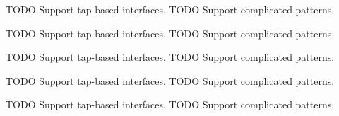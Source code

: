 
\begin{DoxyRefList}
\item[\label{todo__todo000015}%
\Hypertarget{todo__todo000015}%
Member \hyperlink{route-tree_8c_ad4fe4de0af6177aad9c1936fcaa1d988}{analyze\+\_\+anyconnect\+\_\+kernel\+\_\+route} (G\+Node $\ast$kernel\+\_\+route\+\_\+roots\mbox{[}M\+A\+X\+\_\+\+R\+O\+O\+T\+S\+\_\+\+N\+U\+M\+B\+ER\mbox{]}, int $\ast$kernel\+\_\+roots)]T\+O\+DO Support tap-\/based interfaces. T\+O\+DO Support complicated patterns. 
\item[\label{todo__todo000024}%
\Hypertarget{todo__todo000024}%
Member \hyperlink{route-tree_8h_a5a490e2e29be18ae630572e3776539af}{analyze\+\_\+kernel\+\_\+route} (G\+Node $\ast$kernel\+\_\+route\+\_\+roots\mbox{[}M\+A\+X\+\_\+\+R\+O\+O\+T\+S\+\_\+\+N\+U\+M\+B\+ER\mbox{]}, int $\ast$kernel\+\_\+roots, enum V\+P\+N\+\_\+\+M\+E\+T\+H\+O\+DS vpn\+\_\+method)]T\+O\+DO Support tap-\/based interfaces. T\+O\+DO Support complicated patterns.

T\+O\+DO Support tap-\/based interfaces. T\+O\+DO Support complicated patterns. 
\item[\label{todo__todo000014}%
\Hypertarget{todo__todo000014}%
Member \hyperlink{route-tree_8c_a023982baea4d991af1755c75365e6070}{analyze\+\_\+openvpn\+\_\+kernel\+\_\+route} (G\+Node $\ast$kernel\+\_\+route\+\_\+roots\mbox{[}M\+A\+X\+\_\+\+R\+O\+O\+T\+S\+\_\+\+N\+U\+M\+B\+ER\mbox{]}, int $\ast$kernel\+\_\+roots)]T\+O\+DO Support tap-\/based interfaces. T\+O\+DO Support complicated patterns. 
\item[\label{todo__todo000023}%
\Hypertarget{todo__todo000023}%
Member \hyperlink{route-tree_8h_a267529614de44218b8187f3ac46ce46f}{detect\+\_\+vpn\+\_\+method} ()]T\+O\+DO Support tap-\/based interfaces. T\+O\+DO Support complicated patterns. 


\end{DoxyRefList}
